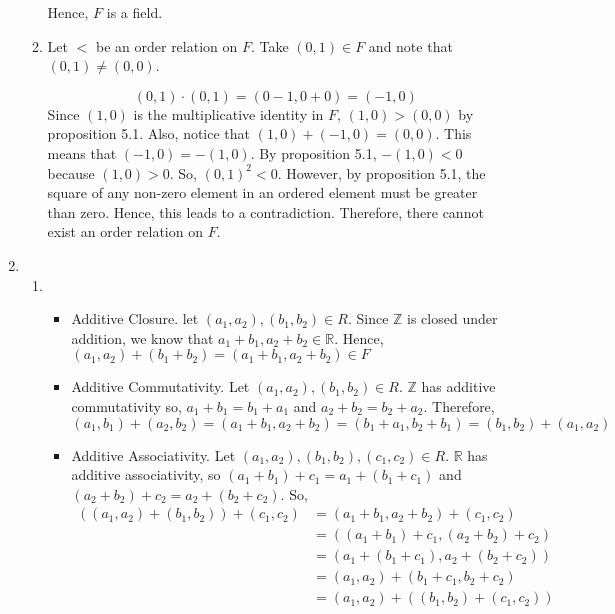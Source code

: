 \documentclass[12pt]{article}
\begin{document}
\begin{enumerate}[start=1,label={\bfseries Problem \arabic*:},leftmargin=1in]
\begin{enumerate}
        Hence, $F$ is a field. 
        \item Let $<$ be an order relation on $F$. 
        Take $(0, 1) \in F$ and note that $(0, 1) \neq (0, 0)$. 

        \[ (0, 1) \cdot (0, 1) = (0 - 1, 0 + 0) = (-1, 0)\]
        Since $(1, 0)$ is the multiplicative identity in $F$, $(1, 0) > (0, 0)$ by proposition 5.1. Also, 
        notice that $(1, 0) + (-1, 0) = (0, 0)$. This means that $(-1, 0) = -(1, 0)$. By proposition 5.1, $-(1, 0) < 0$ because $(1, 0) > 0$. 
        So, $(0, 1)^{2} < 0$. However, by proposition 5.1, the square of any non-zero element in an ordered element must be greater than zero. 
        Hence, this leads to a contradiction. Therefore, there cannot exist an order relation on $F$. 
    \end{enumerate}

    \item 
    \begin{enumerate}
        \item 
    
    
        \begin{itemize}
            \item Additive Closure. let $(a_{1}, a_{2}), (b_{1}, b_{2}) \in R$. Since $\mathbb{Z}$ is
            closed under addition, we know that $a_{1} + b_{1}, a_{2} + b_{2} \in \mathbb{R}$. Hence, $(a_{1}, a_{2}) + (b_{1} + b_{2}) = (a_{1} + b_{1}, a_{2} + b_{2}) \in F$
            
            \item Additive Commutativity. Let $(a_{1}, a_{2}), (b_{1}, b_{2}) \in R$. $\mathbb{Z}$ has additive commutativity so, $a_{1} + b_{1} = b_{1} + a_{1}$ and $a_{2} + b_{2} = b_{2} + a_{2}$. 
            Therefore, $(a_{1}, b_{1}) + (a_{2}, b_{2}) = (a_{1} + b_{1}, a_{2} + b_{2}) = (b_{1} + a_{1}, b_{2} + b_{1}) = (b_{1}, b_{2}) + (a_{1}, a_{2})$

            \item Additive Associativity. Let $(a_{1}, a_{2}), (b_{1}, b_{2}), (c_{1}, c_{2}) \in R$. $\mathbb{R}$ has additive associativity, so $(a_{1} + b_{1}) + c_{1} = a_{1} + (b_{1} + c_{1})$ and $(a_{2} + b_{2}) + c_{2} = a_{2} + (b_{2} + c_{2})$.
            So, 
            \begin{align*}
                ((a_{1}, a_{2}) + (b_{1}, b_{2})) + (c_{1}, c_{2}) &= (a_{1} + b_{1}, a_{2} + b_{2}) + (c_{1}, c_{2}) \\ 
                &= ((a_{1} + b_{1}) + c_{1}, (a_{2} + b_{2}) + c_{2}) \\ 
                &= (a_{1} + (b_{1} + c_{1}), a_{2} + (b_{2} + c_{2})) \\ 
                &= (a_{1}, a_{2}) + (b_{1} + c_{1}, b_{2} + c_{2}) \\ 
                &= (a_{1}, a_{2}) + ((b_{1}, b_{2}) + (c_{1}, c_{2}))
            \end{align*}


\end{itemize}
\end{enumerate}
\end{enumerate}
\end{document}
